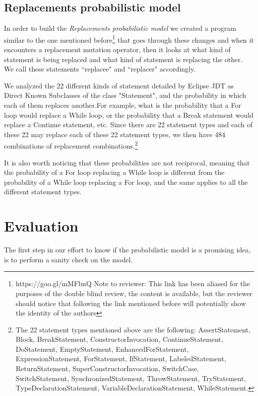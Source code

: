 \documentclass[conference]{IEEEtran}
\begin{document}
\subsection{Replacements probabilistic model}
In order to build the \textit{Replacements probabilistic model} we created a 
program similar to the one mentioned before\footnote{https://goo.gl/mMFbnQ
Note to reviewer: This link has been aliased for the purposes of the double 
blind review, the content is available, but the reviewer should notice that 
following the link mentioned before will potentially show the identity of the authors} that 
goes through these 
changes and when it encounters a  replacement mutation operator, then it looks 
at what kind of statement is being 
replaced and what kind of statement is replacing the other. We call these 
statements ``replacee" and ``replacer" accordingly.


We analyzed the 22 different kinds of statement detailed by Eclipse JDT as Direct Known Subclasses of the class "Statement", and the probability in which each of 
them replaces another.For example, what is the probability that a For loop 
would replace a While loop, or the probability that a Break statement would 
replace a Continue statement, etc. Since there are 22 statement types and each of these 22 may 
replace each of these 22 statement types, we then have 484 combinations of 
replacement combinations.\footnote{The 22 statement types mentioned above are the following: AssertStatement, Block, BreakStatement, ConstructorInvocation, ContinueStatement, DoStatement, EmptyStatement, EnhancedForStatement, ExpressionStatement, ForStatement, IfStatement, LabeledStatement, ReturnStatement, SuperConstructorInvocation, SwitchCase, SwitchStatement, SynchronizedStatement, ThrowStatement, TryStatement, TypeDeclarationStatement, VariableDeclarationStatement, WhileStatement.}

It is also worth noticing that these probabilities are not reciprocal, meaning 
that the probability of a For loop replacing a While loop is different from the 
probability of a While loop replacing a For loop, and the same applies to all 
the different statement types.


\section{Evaluation} \label{evaluation}
The first step in our effort to know if the probabilistic model is a promising idea, is to perform a sanity check on the model.
\end{document}
